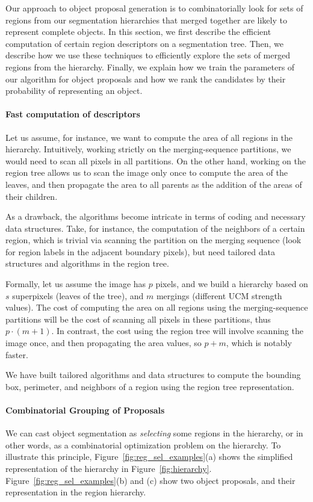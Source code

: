 \documentclass[10pt,journal,cspaper,compsoc]{IEEEtran}
\begin{document}
Our approach to object proposal generation is to combinatorially look for sets of regions from our segmentation hierarchies 
that merged together are likely to represent complete objects.
In this section, we first describe the efficient computation of certain region descriptors on a segmentation tree.
Then, we describe how we use these techniques to efficiently explore the sets of merged regions from the hierarchy.
Finally, we explain how we train the parameters of our algorithm for object proposals and
how we rank the candidates by their probability of representing an object.

\paragraph*{\textbf{Fast computation of descriptors}}
Let us assume, for instance, we want to compute the area of all regions in the hierarchy.
Intuitively, working strictly on the merging-sequence partitions, we would need to scan all pixels
in all partitions.
On the other hand, working on the region tree allows us to scan the image only once to compute the area of the leaves,
and then propagate the area to all parents as the addition of the areas of their children.

As a drawback, the algorithms become intricate in terms of coding and necessary data structures.
Take, for instance, the computation of the neighbors of a certain region,
which is trivial via scanning the partition on the merging sequence (look for region labels in the adjacent boundary pixels),
but need tailored data structures and algorithms in the region tree.

Formally, let us assume the image has $p$ pixels, and we build a hierarchy based on $s$ superpixels
(leaves of the tree), and $m$ mergings (different UCM strength values).
The cost of computing the area on all regions using the merging-sequence partitions
will be the cost of scanning all pixels in these partitions, thus $p\!\cdot\!(m\!+\!1)$.
In contrast, the cost using the region tree will involve scanning the image once, and then
propagating the area values, so $p\!+\!m$, which is notably faster.

We have built tailored algorithms and data structures to compute the
bounding box, perimeter, and neighbors of a region using the region tree representation. 

\paragraph*{\textbf{Combinatorial Grouping of Proposals}}
\label{sec:comb_cands}
We can cast object segmentation as \textit{selecting} some regions in the hierarchy, or in other words,
as a combinatorial optimization problem on the hierarchy.
To illustrate this principle, Figure~\ref{fig:reg_sel_examples}(a) shows the simplified representation
of the hierarchy in Figure~\ref{fig:hierarchy}.
Figure~\ref{fig:reg_sel_examples}(b) and (c) show two object proposals,
and their representation in the region hierarchy.
\end{document}

